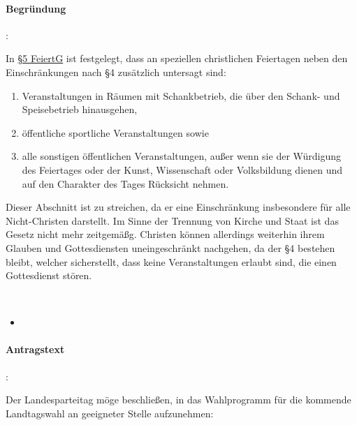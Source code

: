 \paragraph{Begründung}:

In \href{http://st.juris.de/st/FeiertG_ST_P5.htm}{§5 FeiertG} ist festgelegt, dass an speziellen christlichen Feiertagen neben den Einschränkungen nach §4 zusätzlich untersagt sind:

\begin{enumerate}
\item Veranstaltungen in Räumen mit Schankbetrieb, die über den Schank- und Speisebetrieb hinausgehen,
\item öffentliche sportliche Veranstaltungen sowie
\item alle sonstigen öffentlichen Veranstaltungen, außer wenn sie der Würdigung des Feiertages oder der Kunst, Wissenschaft oder Volksbildung dienen und auf den Charakter des Tages Rücksicht nehmen.
\end{enumerate}

Dieser Abschnitt ist zu streichen, da er eine Einschränkung insbesondere für alle Nicht-Christen darstellt. Im Sinne der Trennung von Kirche und Staat ist das Gesetz nicht mehr zeitgemäßg. Christen können allerdings weiterhin ihrem Glauben und Gottesdiensten uneingeschränkt nachgehen, da der §4 bestehen bleibt, welcher sicherstellt, dass keine Veranstaltungen erlaubt sind, die einen Gottesdienst stören.


\label{wpa:smsnotruf1}
\\
\begin{itemize}
\item {}
\end{itemize}

\paragraph{Antragstext}:

Der Landesparteitag möge beschließen, in das Wahlprogramm für die kommende Landtagswahl an geeigneter Stelle aufzunehmen:


